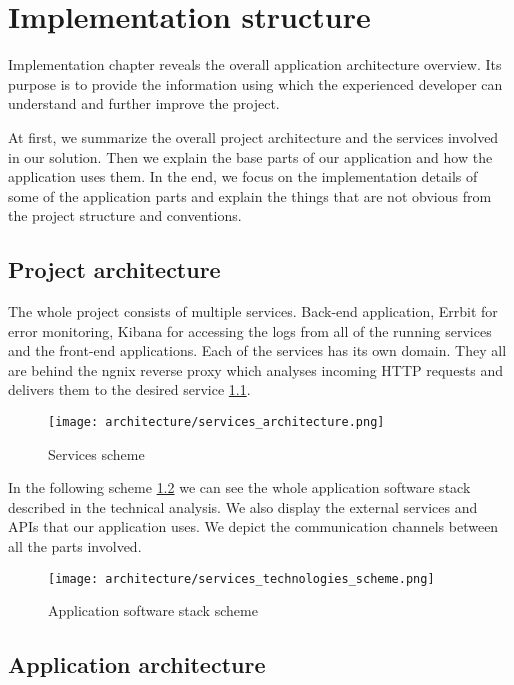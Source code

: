 \chapter{Implementation structure}
Implementation chapter reveals the overall application architecture overview. Its purpose is to provide the information using which the experienced developer can understand and further improve the project. 

At first, we summarize the overall project architecture and the services involved in our solution. Then we explain the base parts of our application and how the application uses them. In the end, we focus on the implementation details of some of the application parts and explain the things that are not obvious from the project structure and conventions.


\section{Project architecture}

The whole project consists of multiple services. Back-end application, Errbit for error monitoring, Kibana for accessing the logs from all of the running services and the front-end applications. Each of the services has its own domain. They all are behind the ngnix reverse proxy which analyses incoming HTTP requests and delivers them to the desired service \ref{services-scheme}.  
\begin{figure}[h]\centering
	\texttt{[image: architecture/services\_architecture.png]}
	\caption{Services scheme} 
	\label{services-scheme}
\end{figure} 

In the following scheme 
\ref{application-sw-stack-scheme} we can see the whole application software stack described in the technical analysis. We also display the external services and APIs that our application uses. We depict the communication channels between all the parts involved.
 \begin{figure}[h]\centering
 	\texttt{[image: architecture/services\_technologies\_scheme.png]}
 	\caption{Application software stack scheme} 
 	\label{application-sw-stack-scheme}
 \end{figure} 
 



\section {Application architecture}

